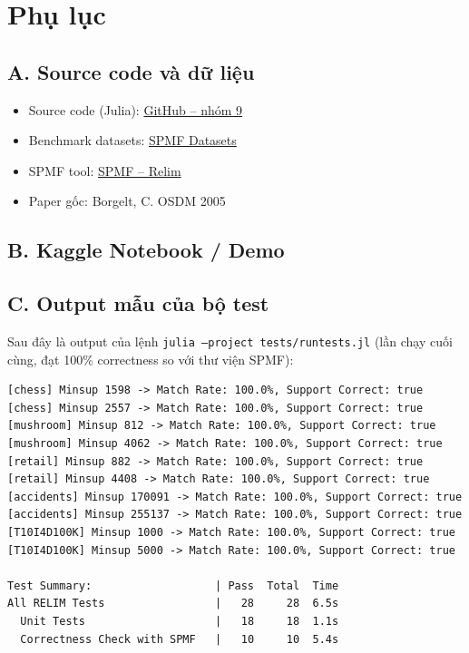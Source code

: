 \documentclass[12pt,a4paper]{report}
\begin{document}
 
\appendix
\renewcommand{\appendixname}{Phụ lục}
 
\chapter*{Phụ lục}
 
\section*{A. Source code và dữ liệu}
\begin{itemize}
  \item Source code (Julia): \href{https://github.com/...}{GitHub -- nhóm 9}
  \item Benchmark datasets: \href{https://www.philippe-fournier-viger.com/spmf/index.php?link=datasets.php}{SPMF Datasets}
  \item SPMF tool: \href{https://www.philippe-fournier-viger.com/spmf/Relim.php}{SPMF -- Relim}
  \item Paper gốc: Borgelt, C. OSDM 2005
\end{itemize}
 
\section*{B. Kaggle Notebook / Demo}
 
\section*{C. Output mẫu của bộ test}

Sau đây là output của lệnh \texttt{julia --project tests/runtests.jl} (lần chạy cuối cùng, đạt 100\% correctness so với thư viện SPMF):

\begin{verbatim}
[chess] Minsup 1598 -> Match Rate: 100.0%, Support Correct: true
[chess] Minsup 2557 -> Match Rate: 100.0%, Support Correct: true
[mushroom] Minsup 812 -> Match Rate: 100.0%, Support Correct: true
[mushroom] Minsup 4062 -> Match Rate: 100.0%, Support Correct: true
[retail] Minsup 882 -> Match Rate: 100.0%, Support Correct: true
[retail] Minsup 4408 -> Match Rate: 100.0%, Support Correct: true
[accidents] Minsup 170091 -> Match Rate: 100.0%, Support Correct: true
[accidents] Minsup 255137 -> Match Rate: 100.0%, Support Correct: true
[T10I4D100K] Minsup 1000 -> Match Rate: 100.0%, Support Correct: true
[T10I4D100K] Minsup 5000 -> Match Rate: 100.0%, Support Correct: true

Test Summary:                   | Pass  Total  Time
All RELIM Tests                 |   28     28  6.5s
  Unit Tests                    |   18     18  1.1s
  Correctness Check with SPMF   |   10     10  5.4s
\end{verbatim}
 
\end{document}

